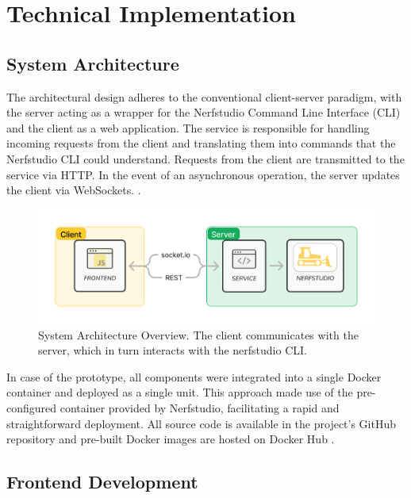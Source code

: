 %
\chapter{Technical Implementation}
\label{sec:system}

\section{System Architecture}
\label{sec:system:architecture}

The architectural design adheres to the conventional client-server paradigm, with the server acting as a wrapper for the Nerfstudio Command Line Interface (CLI) and the client as a web application.
The service is responsible for handling incoming requests from the client and translating them into commands that the Nerfstudio CLI could understand.
Requests from the client are transmitted to the service via HTTP.
In the event of an asynchronous operation, the server updates the client via WebSockets. .

\begin{figure}[htb]
	\includegraphics[width=\textwidth]{figures/architecture-1.png}
	\caption{System Architecture Overview. The client communicates with the server, which in turn interacts with the nerfstudio CLI.}
	\label{fig:system:example2}
\end{figure}

In case of the prototype, all components were integrated into a single Docker \cite{noauthor_docker_2022} container and deployed as a single unit.
This approach made use of the pre-configured container provided by Nerfstudio, facilitating a rapid and straightforward deployment.
All source code is available in the project's GitHub repository \cite{von_briesen_simplify-nerf_2024} and pre-built Docker images are hosted on Docker Hub \cite{von_briesen_eduardvbsimplify-nerf_nodate}.

\section{Frontend Development} 
\label{sec:system:frontend}

